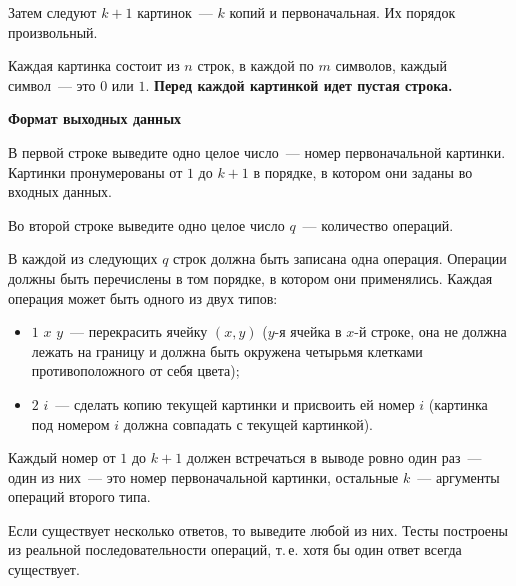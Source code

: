 \documentclass[times,specification,annotation]{style/itmo-student-thesis/itmo-student-thesis}
\begin{document}
Затем следуют $k+1$ картинок~--- $k$ копий и первоначальная. Их порядок произвольный.

Каждая картинка состоит из $n$ строк, в каждой по $m$ символов, каждый символ~--- это $0$ или $1$. \textbf{Перед каждой картинкой идет пустая строка.}


\textbf{Формат выходных данных}

В первой строке выведите одно целое число~--- номер первоначальной картинки. Картинки пронумерованы от $1$ до $k+1$ в порядке, в котором они заданы во входных данных.

Во второй строке выведите одно целое число $q$~--- количество операций.

В каждой из следующих $q$ строк должна быть записана одна операция. Операции должны быть перечислены в том порядке, в котором они применялись. Каждая операция может быть одного из двух типов:
\begin{itemize}[leftmargin=1.75cm]
\item $1$ $x$ $y$~--- перекрасить ячейку $(x, y)$ ($y$-я ячейка в $x$-й строке, она не должна лежать на границу и должна быть окружена четырьмя клетками противоположного от себя цвета);
\item $2$ $i$~--- сделать копию текущей картинки и присвоить ей номер $i$ (картинка под номером $i$ должна совпадать с текущей картинкой).
\end{itemize}

Каждый номер от $1$ до $k+1$ должен встречаться в выводе ровно один раз~--- один из них~--- это номер первоначальной картинки, остальные $k$~--- аргументы операций второго типа.

Если существует несколько ответов, то выведите любой из них. Тесты построены из реальной последовательности операций, т.\,е. хотя бы один ответ всегда существует.

%
%
%
\end{document}
